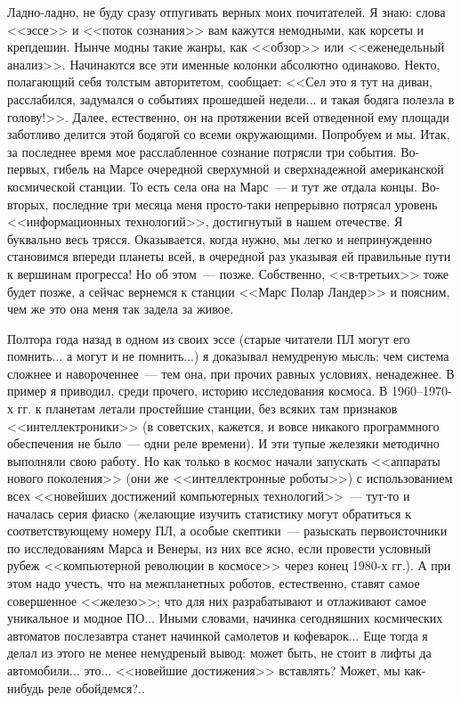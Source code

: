 \documentclass{scrbook}
\newcommand{\flqq}{<<}
\newcommand{\frqq}{>>}
\newcommand{\mdash}{~--- }
\newcommand{\ndash}{--}
\begin{document}
Ладно-ладно, не буду сразу отпугивать верных моих почитателей. Я знаю: слова {\flqq}эссе{\frqq} и {\flqq}поток сознания{\frqq} вам кажутся немодными, как корсеты и крепдешин. Нынче модны такие жанры, как {\flqq}обзор{\frqq} или {\flqq}еженедельный анализ{\frqq}. Начинаются все эти именные колонки абсолютно одинаково. Некто, полагающий себя толстым авторитетом, сообщает: {\flqq}Сел это я тут на диван, расслабился, задумался о событиях прошедшей недели... и такая бодяга полезла в голову!{\frqq}. Далее, естественно, он на протяжении всей отведенной ему площади заботливо делится этой бодягой со всеми окружающими. Попробуем и мы. Итак, за последнее время мое расслабленное сознание потрясли три события. Во-первых, гибель на Марсе очередной сверхумной и сверхнадежной американской космической станции. То есть села она на Марс{\mdash}и тут же отдала концы. Во-вторых, последние три месяца меня просто-таки непрерывно потрясал уровень {\flqq}информационных технологий{\frqq}, достигнутый в нашем отечестве. Я буквально весь трясся. Оказывается, когда нужно, мы легко и непринужденно становимся впереди планеты всей, в очередной раз указывая ей правильные пути к вершинам прогресса! Но об этом{\mdash}позже. Собственно, {\flqq}в-третьих{\frqq} тоже будет позже, а сейчас вернемся к станции {\flqq}Марс Полар Ландер{\frqq} и поясним, чем же это она меня так задела за живое.

Полтора года назад в одном из своих эссе (старые читатели ПЛ могут его помнить... а могут и не помнить...) я доказывал немудреную мысль: чем система сложнее и навороченнее{\mdash}тем она, при прочих равных условиях, ненадежнее. В пример я приводил, среди прочего, историю исследования космоса. В 1960{\ndash}1970-х гг. к планетам летали простейшие станции, без всяких там признаков {\flqq}интеллектроники{\frqq} (в советских, кажется, и вовсе никакого программного обеспечения не было{\mdash}одни реле времени). И эти тупые железяки методично выполняли свою работу. Но как только в космос начали запускать {\flqq}аппараты нового поколения{\frqq} (они же {\flqq}интеллектронные роботы{\frqq}) с использованием всех {\flqq}новейших достижений компьютерных технологий{\frqq}{\mdash}тут-то и началась серия фиаско (желающие изучить статистику могут обратиться к соответствующему номеру ПЛ, а особые скептики{\mdash}разыскать первоисточники по исследованиям Марса и Венеры, из них все ясно, если провести условный рубеж {\flqq}компьютерной революции в космосе{\frqq} через конец 1980-х гг.). А при этом надо учесть, что на межпланетных роботов, естественно, ставят самое совершенное {\flqq}железо{\frqq}; что для них разрабатывают и отлаживают самое уникальное и модное ПО... Иными словами, начинка сегодняшних космических автоматов послезавтра станет начинкой самолетов и кофеварок... Еще тогда я делал из этого не менее немудреный вывод: может быть, не стоит в лифты да автомобили... это... {\flqq}новейшие достижения{\frqq} вставлять? Может, мы как-нибудь реле обойдемся?..
\end{document}
